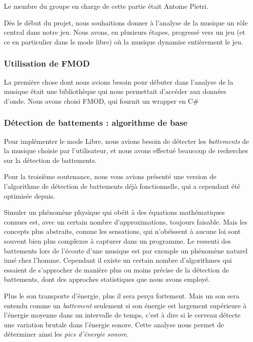 \par Le membre du groupe en charge de cette partie était Antoine Pietri.
\vspace{1cm}
\par Dès le début du projet, nous souhaitions donner à l'analyse de la musique un rôle central dans notre jeu.
Nous avons, en plusieurs étapes, progressé vers un jeu (et ce en particulier dans le mode libre) où la musique
dynamise entièrement le jeu.

\subsubsection{Utilisation de FMOD}

La première chose dont nous avions besoin pour débuter dans l'analyse de la musique était une bibliothèque
qui nous permettait d'accéder aux données d'onde. Nous avons choisi FMOD, qui fournit un wrapper en C\#

\subsubsection{Détection de battements : algorithme de base}

\par Pour implémenter le mode Libre, nous avions besoin de détecter les \emph{battements} de la musique choisie par l'utilisateur, et nous avons effectué beaucoup de recherches sur la détection de battements.

\par Pour la troisième soutenance, nous vous avions présenté une version de l'algorithme de détection de battements déjà fonctionnelle, qui a cependant été optimisée depuis.
	
\par Simuler un phénomène physique qui obéit à des équations mathématiques connues est, avec un certain nombre d'approximations, toujours faisable. Mais les concepts plus abstraits, comme les sensations, qui n'obéissent à aucune loi sont souvent bien plus complexes à capturer dans un programme. Le ressenti des battements lors de l'écoute d'une musique est par exemple un phénomène naturel inné chez l'homme. Cependant il existe un certain nombre d'algorithmes qui essaient de s'approcher de manière plus ou moins précise de la détection de battements, dont des approches statistiques que nous avons employé.
\par Plus le son transporte d'énergie, plus il sera perçu fortement. Mais un son sera entendu comme un \emph{battement} seulement si son énergie est largement supérieure à l'énergie moyenne dans un intervalle de temps, c'est à dire si le cerveau détecte une variation brutale dans l'énergie sonore. Cette analyse nous permet de déterminer ainsi les \emph{pics d'énergie sonore}.

